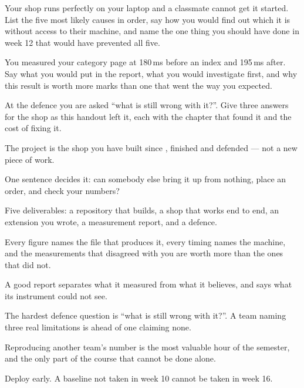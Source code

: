 \begin{checkpoint}
\begin{tightnum}
  \item Your shop runs perfectly on your laptop and a classmate cannot get it
        started. List the five most likely causes in order, say how you would
        find out which it is without access to their machine, and name the one
        thing you should have done in week 12 that would have prevented all
        five.
  \item You measured your category page at 180\,ms before an index and 195\,ms
        after. Say what you would put in the report, what you would investigate
        first, and why this result is worth more marks than one that went the
        way you expected.
  \item At the defence you are asked ``what is still wrong with it?''. Give
        three answers for the shop as this handout left it, each with the
        chapter that found it and the cost of fixing it.
\end{tightnum}
\end{checkpoint}

\begin{chaptersummary}
\begin{tight}
  \item The project is the shop you have built since , finished
        and defended --- not a new piece of work.
  \item One sentence decides it: can somebody else bring it up from nothing,
        place an order, and check your numbers?
  \item Five deliverables: a repository that builds, a shop that works end to
        end, an extension you wrote, a measurement report, and a defence.
  \item Every figure names the file that produces it, every timing names the
        machine, and the measurements that disagreed with you are worth more
        than the ones that did not.
  \item A good report separates what it measured from what it believes, and
        says what its instrument could not see.
  \item The hardest defence question is ``what is still wrong with it?''. A
        team naming three real limitations is ahead of one claiming none.
  \item Reproducing another team's number is the most valuable hour of the
        semester, and the only part of the course that cannot be done alone.
  \item Deploy early. A baseline not taken in week 10 cannot be taken in week
        16.
\end{tight}
\end{chaptersummary}

